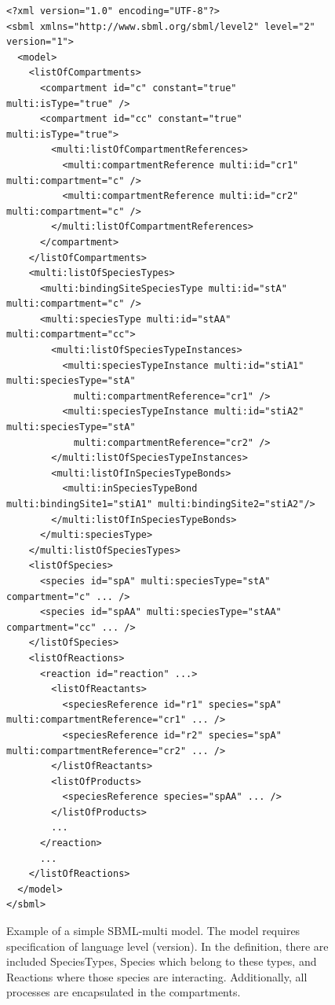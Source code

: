 \documentclass[11pt,a4paper]{report}
\begin{document}
\begin{figure}[!h]
\lstset{language=XML}
\begin{lstlisting}[basicstyle=\scriptsize, frame=single]
<?xml version="1.0" encoding="UTF-8"?>
<sbml xmlns="http://www.sbml.org/sbml/level2" level="2" version="1">
  <model>
    <listOfCompartments>
      <compartment id="c" constant="true" multi:isType="true" />
      <compartment id="cc" constant="true" multi:isType="true">
        <multi:listOfCompartmentReferences>
          <multi:compartmentReference multi:id="cr1" multi:compartment="c" />
          <multi:compartmentReference multi:id="cr2" multi:compartment="c" />
        </multi:listOfCompartmentReferences>
      </compartment>
    </listOfCompartments>
    <multi:listOfSpeciesTypes>
      <multi:bindingSiteSpeciesType multi:id="stA" multi:compartment="c" />
      <multi:speciesType multi:id="stAA" multi:compartment="cc">
        <multi:listOfSpeciesTypeInstances>
          <multi:speciesTypeInstance multi:id="stiA1" multi:speciesType="stA"
            multi:compartmentReference="cr1" />
          <multi:speciesTypeInstance multi:id="stiA2" multi:speciesType="stA"
            multi:compartmentReference="cr2" />
        </multi:listOfSpeciesTypeInstances>
        <multi:listOfInSpeciesTypeBonds>
          <multi:inSpeciesTypeBond multi:bindingSite1="stiA1" multi:bindingSite2="stiA2"/>
        </multi:listOfInSpeciesTypeBonds>
      </multi:speciesType>
    </multi:listOfSpeciesTypes>
    <listOfSpecies>
      <species id="spA" multi:speciesType="stA" compartment="c" ... />
      <species id="spAA" multi:speciesType="stAA" compartment="cc" ... />
    </listOfSpecies>
    <listOfReactions>
      <reaction id="reaction" ...>
        <listOfReactants>
          <speciesReference id="r1" species="spA" multi:compartmentReference="cr1" ... />
          <speciesReference id="r2" species="spA" multi:compartmentReference="cr2" ... />
        </listOfReactants>
        <listOfProducts>
          <speciesReference species="spAA" ... />
        </listOfProducts>
        ...
      </reaction>
      ...
    </listOfReactions>
  </model>
</sbml>
\end{lstlisting}
\caption{Example of a simple SBML-multi model. The model requires specification of language level (version). In the definition, there are included SpeciesTypes, Species which belong to these types, and Reactions where those species are interacting. Additionally, all processes are encapsulated in the compartments.}\label{SBML_example}
\end{figure}
\end{document}
